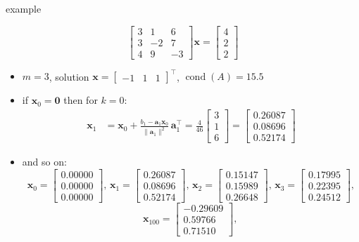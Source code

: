 \documentclass[usepdftitle=false,usenames,dvipsnames]{beamer}
\newcommand{\cond}{\operatorname{cond}}
\newcommand{\ba}{\mathbf{a}}
\newcommand{\bx}{\mathbf{x}}
\newcommand{\bzero}{\bm{0}}
\newcommand{\ds}{\displaystyle}
\begin{document}
\begin{frame}{example}

    $$\begin{bmatrix} 3 & 1 & 6 \\ 3 & -2 & 7 \\ 4 & 9 & -3 \end{bmatrix} \bx = \begin{bmatrix} 4 \\ 2 \\ 2 \end{bmatrix}$$

\begin{itemize}
\item $m=3$, solution $\ds \bx = \begin{bmatrix} -1 & 1 & 1 \end{bmatrix}^\top$, $\cond(A)=15.5$
\item if $\bx_0=\bzero$ then for $k=0$:
\begin{align*}
\bx_1 &= \bx_0 + \frac{b_1 - \ba_1 \bx_0}{\|\ba_1\|^2}\, \ba_1^\top = \frac{4}{46} \begin{bmatrix} 3 \\ 1 \\ 6 \end{bmatrix} =
\begin{bmatrix} 0.26087 \\ 0.08696 \\ 0.52174 \end{bmatrix}
\end{align*}
\item and so on:
{\scriptsize
$$\bx_0=\begin{bmatrix}  0.00000 \\ 0.00000 \\ 0.00000 \end{bmatrix}, \,
\bx_1=\begin{bmatrix}  0.26087 \\  0.08696 \\  0.52174 \end{bmatrix}, \,
\bx_2=\begin{bmatrix}  0.15147 \\  0.15989 \\  0.26648 \end{bmatrix}, \,
\bx_3=\begin{bmatrix}  0.17995 \\  0.22395 \\  0.24512 \end{bmatrix},$$
$$\bx_{100}=\begin{bmatrix} -0.29609  \\ 0.59766  \\ 0.71510 \end{bmatrix}, \,
$$}
\end{itemize}
\end{frame}
\end{document}
